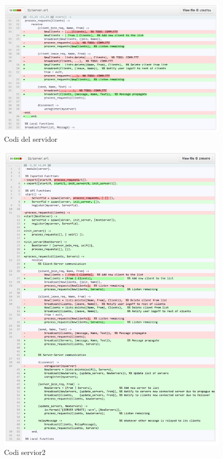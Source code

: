 \documentclass[a4paper, 11pt]{article}
\begin{document}
\begin{figure}[H]
	\centering
    \includegraphics[width=1.0\textwidth]{figures/server}
    \caption{Codi del servidor \label{fig:servercode}}    
\end{figure}

\begin{figure}[H]
	\centering
    \includegraphics[width=1.0\textwidth]{figures/multiserver}
    \caption{Codi servior2 \label{fig:servercode2}}    
\end{figure}
\end{document}
